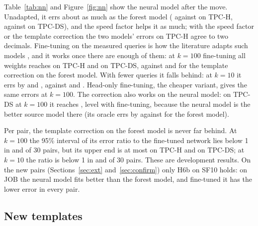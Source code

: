 \documentclass[conference]{IEEEtran}
\begin{document}
Table~\ref{tab:nn} and Figure~\ref{fig:nn} show the neural model after the
move. Unadapted, it errs about as much as the forest model
(\NNDevTpchRrNnNoneKOneZero{} against \NNDevTpchRrHybNoneKOneZero{} on
TPC-H, \NNDevTpcdsRrNnNoneKOneZero{} against \NNDevTpcdsRrHybNoneKOneZero{}
on TPC-DS), and the speed factor helps it as much; with the speed factor or
the template correction the two models' errors on TPC-H agree to two
decimals. Fine-tuning on the measured queries is how the literature adapts
such models \cite{liang2024dace}, and it works once there are enough of them: at $k=100$ fine-tuning all
weights reaches \NNDevTpchRrNnFullKOneZeroZero{} on TPC-H and
\NNDevTpcdsRrNnFullKOneZeroZero{} on TPC-DS, against
\NNDevTpchRrHybTplKOneZeroZero{} and \NNDevTpcdsRrHybTplKOneZeroZero{} for
the template correction on the forest model. With fewer queries it falls
behind: at $k=10$ it errs by \NNDevTpchRrNnFullKOneZero{} and
\NNDevTpcdsRrNnFullKOneZero, against \NNDevTpchRrHybTplKOneZero{} and
\NNDevTpcdsRrHybTplKOneZero. Head-only fine-tuning, the cheaper variant,
gives the same errors at $k=100$. The correction also works on the neural
model: on TPC-DS at $k=100$ it reaches \NNDevTpcdsRrNnTplKOneZeroZero, level
with fine-tuning, because the neural model is the better source model there
(its oracle errs by \NNDevTpcdsRrNnOracleKOneZeroZero{} against
\PLadTpcdsOracleRandom{} for the forest model).

Per pair, the template correction on the forest model is never far behind.
At $k=100$ the 95\% interval of its error ratio to the fine-tuned network
lies below 1 in \NNDevTpchHSixFullKOneZeroZeroBelow{} and
\NNDevTpcdsHSixFullKOneZeroZeroBelow{} of 30 pairs, but its upper end is at
most \NNDevTpchHSixFullKOneZeroZeroMaxHi{} on TPC-H and
\NNDevTpcdsHSixFullKOneZeroZeroMaxHi{} on TPC-DS; at $k=10$ the ratio is
below 1 in \NNDevTpchHSixFullKOneZeroPoint{} and
\NNDevTpcdsHSixFullKOneZeroPoint{} of 30 pairs. These are development
results. On the new pairs (Sections~\ref{sec:ext} and~\ref{sec:confirm})
only H6b on SF10 holds: on JOB the neural model fits better than the
forest model, and fine-tuned it has the lower error in every pair.

\subsection{New templates}
\label{sec:unseen}
\end{document}
